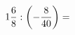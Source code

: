 \documentclass[preview]{standalone}
\begin{document}
\begin{align*}
1 { 6 \over 8 }  :  \left( - { 8 \over 40 } \right)  =
\end{align*}
\end{document}
